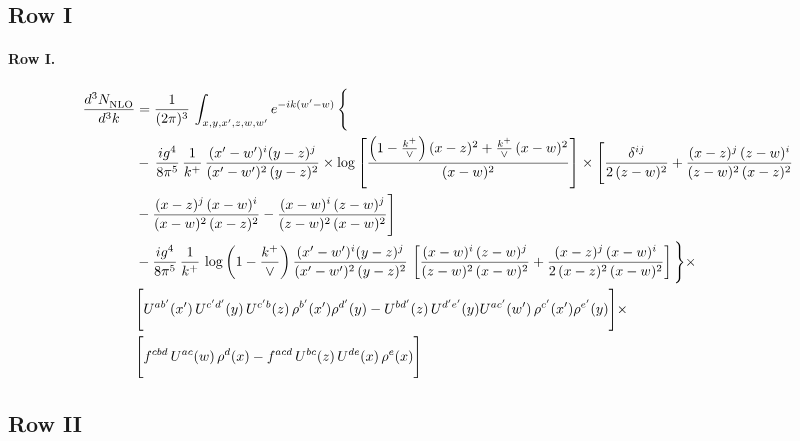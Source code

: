 \documentclass[10pt]{article}
\numberwithin{equation}{section}
\begin{document}
\subsection{Row I}
\paragraph{Row I.}
\begin{align}
     \frac{d^{3}N_{\rm NLO}^{\rm}}{d^{3}k}  & =   \frac{1}{(2\pi)^{3}}\, \int_{x,y,x',z,w,w^{\prime}} e^{-ik(w^{\prime}-w)}\, \Bigg\{\notag \\
& -\,\frac{ig^{4}}{8\pi^{5}}\,\frac{1}{k^{+}}\,\frac{(x'-w')^{i}(y-z)^{j}}{(x'-w')^{2}\,(y-z)^{2}}\times \log{\left[\frac{\left(1-\frac{k^{+}}{\vee}\right)(x-z)^{2}+\frac{k^{+}}{\vee}\,(x-w)^{2}}{(x-w)^{2}}\right]}\times \Bigg[\frac{\delta^{ij}}{2\,(z-w)^{2}}+\frac{(x-z)^{j}\,(z-w)^{i}}{(z-w)^{2}\,(x-z)^{2}}\notag \\ & -\frac{(x-z)^{j}\,(x-w)^{i}}{(x-w)^{2}\,(x-z)^{2}}-\frac{(x-w)^{i}\,(z-w)^{j}}{(z-w)^{2}\,(x-w)^{2}}\Bigg] \notag \\
& -\frac{ig^{4}}{8\pi^{5}}\,\frac{1}{k^{+}}\,\log{\left(1-\frac{k^{+}}{\vee}\right)}\,\frac{(x'-w')^{i}(y-z)^{j}}{(x'-w')^{2}\,(y-z)^{2}}\,\left[\frac{(x-w)^{i}\,(z-w)^{j}}{(z-w)^{2}\,(x-w)^{2}}+\frac{(x-z)^{j}\,(x-w)^{i}}{2\,(x-z)^{2}\, (x-w)^{2}}\right]\Bigg\}\times \notag \\ &  \Bigg[U^{ab'}(x')\,U^{c'd'}(y)\,U^{c'b}(z)\,\rho^{b'}(x')\rho^{d'}(y)-U^{bd'}(z)\,U^{d'e'}(y)U^{ac'}(w')\,\rho^{c'}(x')\rho^{e'}(y)\Bigg]\times\notag \\ & \Bigg[f^{cbd}\,U^{ac}(w)\,\rho^{d}(x)-f^{acd}\, U^{bc}(z)\,U^{de}(x)\,\rho^{e}(x)\Bigg] \label{eq:F:G3I}
\end{align}

\subsection{Row II}
\end{document}
